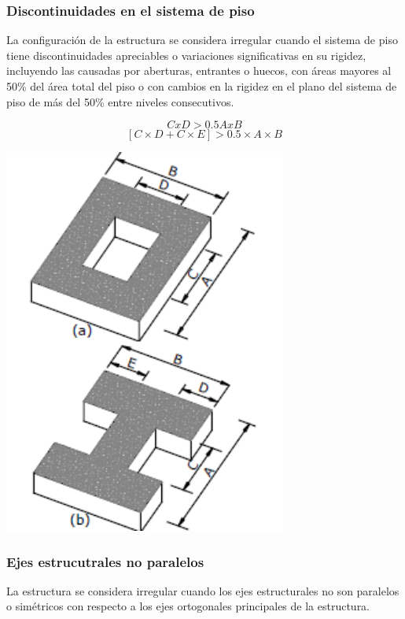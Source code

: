 \documentclass{report}
\begin{document}
\subsubsection{Discontinuidades en el sistema de piso }
La configuraci\'on de la estructura se considera irregular cuando el sistema de piso tiene discontinuidades apreciables o variaciones 
significativas en su rigidez, incluyendo las causadas por aberturas, entrantes o huecos, con \'areas mayores al 50\% del 
\'area total del piso o con cambios en la rigidez en el plano del sistema de piso de m\'as del 50\% entre niveles consecutivos.

\begin{center}
    \begin{minipage}{0.4\textwidth}
        \centering
        $$CxD > 0.5AxB $$
        $$[C \times D + C \times E] > 0.5 \times A \times B$$
    \end{minipage}%
    \begin{minipage}{0.4\textwidth}
        \centering
        \includegraphics[width=0.7\textwidth]{imagenes/discontinuidades_en_el_sistema_de_piso.png}
    \end{minipage}
\end{center}

\subsubsection{Ejes estrucutrales no paralelos }
La estructura se considera irregular cuando los ejes estructurales no son paralelos o sim\'etricos 
con respecto a los ejes ortogonales principales de la estructura.
\end{document}
